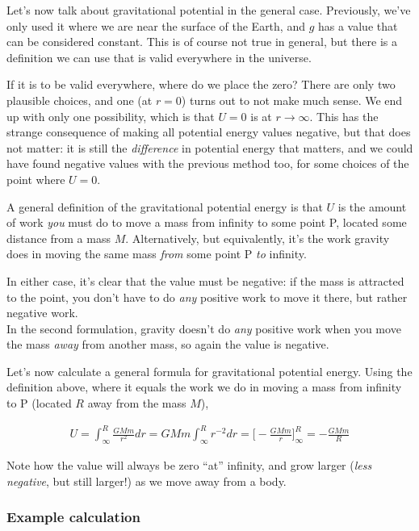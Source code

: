 Let's now talk about gravitational potential in the general case. Previously, we've only used it where we are near the surface of the Earth, and $g$ has a value that can be considered constant. This is of course not true in general, but there is a definition we can use that is valid everywhere in the universe.

If it is to be valid everywhere, where do we place the zero? There are only two plausible choices, and one (at $r = 0$) turns out to not make much sense. We end up with only one possibility, which is that $U = 0$ is at $r \to \infty$. This has the strange consequence of making all potential energy values negative, but that does not matter: it is still the \emph{difference} in potential energy that matters, and we could have found negative values with the previous method too, for some choices of the point where $U = 0$.

A general definition of the gravitational potential energy is that $U$ is the amount of work \emph{you} must do to move a mass from infinity to some point P, located some distance from a mass $M$. Alternatively, but equivalently, it's the work gravity does in moving the same mass \emph{from} some point P \emph{to} infinity.

In either case, it's clear that the value must be negative: if the mass is attracted to the point, you don't have to do \emph{any} positive work to move it there, but rather negative work.\\
In the second formulation, gravity doesn't do \emph{any} positive work when you move the mass \emph{away} from another mass, so again the value is negative.

Let's now calculate a general formula for gravitational potential energy. Using the definition above, where it equals the work we do in moving a mass from infinity to P (located $R$ away from the mass $M$),

\begin{align}
U = \int_\infty^R \frac{G M m}{r^2} dr = G M m \int_\infty^R r^{-2} dr = \Big[-\frac{G M m}{r}\Big]_\infty^R = -\frac{G M m}{R}
\end{align}

Note how the value will always be zero ``at'' infinity, and grow larger (\emph{less negative}, but still larger!) as we move away from a body.

\subsubsection{Example calculation}

